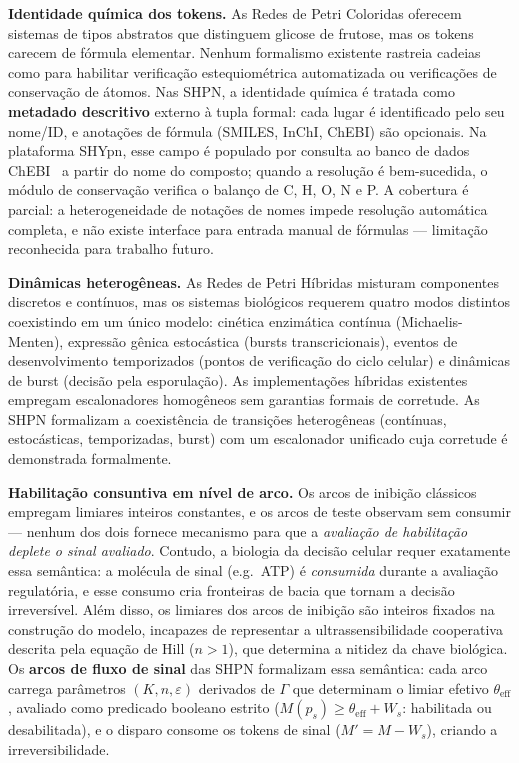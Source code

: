 \textbf{Identidade química dos tokens.}
As Redes de Petri Coloridas oferecem sistemas de tipos abstratos que distinguem
glicose de frutose, mas os tokens carecem de fórmula elementar. Nenhum
formalismo existente rastreia cadeias como  para habilitar
verificação estequiométrica automatizada ou verificações de conservação de
átomos. Nas SHPN, a identidade química é tratada como \textbf{metadado
descritivo} externo à tupla formal: cada lugar é identificado pelo seu
nome/ID, e anotações de fórmula (SMILES, InChI, ChEBI) são opcionais.
Na plataforma SHYpn, esse campo
é populado por consulta ao banco de dados ChEBI~\cite{ChEBI} a partir
do nome do composto; quando a resolução é bem-sucedida, o módulo de
conservação verifica o balanço de C, H, O, N e P. A cobertura é
parcial: a heterogeneidade de notações de nomes impede resolução
automática completa, e não existe interface para entrada manual de
fórmulas --- limitação reconhecida para trabalho futuro.

\textbf{Dinâmicas heterogêneas.} As Redes de Petri
Híbridas misturam componentes discretos e contínuos, mas os sistemas biológicos
requerem quatro modos distintos coexistindo em um único modelo: cinética
enzimática contínua (Michaelis-Menten), expressão gênica estocástica (bursts
transcricionais), eventos de desenvolvimento temporizados (pontos de verificação
do ciclo celular) e dinâmicas de burst (decisão pela esporulação). As
implementações híbridas existentes empregam escalonadores homogêneos sem garantias
formais de corretude. As SHPN formalizam a coexistência de transições
heterogêneas (contínuas, estocásticas, temporizadas, burst) com um escalonador
unificado cuja corretude é demonstrada formalmente.

\textbf{Habilitação consuntiva em nível de arco.}
Os arcos de inibição clássicos empregam limiares inteiros constantes, e os arcos
de teste observam sem consumir --- nenhum dos dois fornece mecanismo para que
a \emph{avaliação de habilitação deplete o sinal avaliado}. Contudo, a biologia
da decisão celular requer exatamente essa semântica: a molécula de sinal
(e.g.\ ATP) é \emph{consumida} durante a avaliação regulatória, e esse consumo
cria fronteiras de bacia que tornam a decisão irreversível. Além disso, os
limiares dos arcos de inibição são inteiros fixados na construção do modelo,
incapazes de representar a ultrassensibilidade cooperativa descrita pela equação
de Hill ($n > 1$), que determina a nitidez da chave biológica.
Os \textbf{arcos de fluxo de sinal} das SHPN formalizam essa semântica: cada arco
carrega parâmetros $(K, n, \varepsilon)$ derivados de $\Gamma$ que determinam o limiar efetivo
$\theta_{\text{eff}}$, avaliado como predicado booleano estrito
($M(p_s) \geq \theta_{\text{eff}} + W_s$: habilitada ou desabilitada),
e o disparo consome os tokens de sinal ($M' = M - W_s$), criando a
irreversibilidade.

